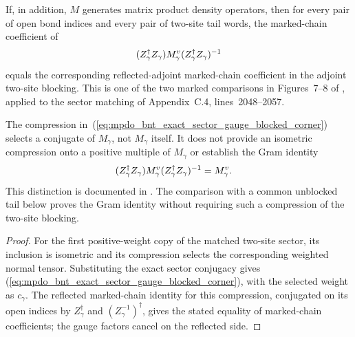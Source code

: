 \begin{lemma}
\begin{center}
\begin{tenkz}[rows={wire}, cols=3, west=open, east=open]
        \end{tenkz}
    \end{center}
    If, in addition, $M$ generates matrix product density operators, then for
    every pair of open bond indices and every pair of two-site tail words, the
    marked-chain coefficient of
    \begin{align}
        (Z_\gamma^\dagger Z_\gamma)M_\gamma^v
        (Z_\gamma^\dagger Z_\gamma)^{-1}
        \notag
    \end{align}
    equals the corresponding reflected-adjoint marked-chain coefficient in
    the adjoint two-site blocking. This is one of the two marked comparisons
    in Figures~7--8 of
    \cite[Proposition~4.13, lines~1909--1919]{Cirac2016MPDO_arXiv}, applied
    to the sector matching of Appendix~C.4, lines~2048--2057.

    The compression in~(\ref{eq:mpdo_bnt_exact_sector_gauge_blocked_corner})
    selects a conjugate of $M_\gamma$, not $M_\gamma$ itself. It does not
    provide an isometric compression onto a positive multiple of $M_\gamma$
    or establish the Gram identity
    \begin{align}
        (Z_\gamma^\dagger Z_\gamma)M_\gamma^v
        (Z_\gamma^\dagger Z_\gamma)^{-1}
         & =M_\gamma^v.
        \notag
    \end{align}
    This distinction is documented in
    \cite{gap:cpsv16_two_site_sector_unitary_gauge_gap}.
    The comparison with a common unblocked tail below proves the Gram
    identity without requiring such a compression of the two-site blocking.
\end{lemma}

\begin{proof}\leanok
    For the first positive-weight copy of the matched two-site sector,
    its inclusion is isometric and its compression selects the
    corresponding weighted normal tensor. Substituting the exact sector
    conjugacy gives
    (\ref{eq:mpdo_bnt_exact_sector_gauge_blocked_corner}), with the selected
    weight as $c_\gamma$. The reflected marked-chain identity for this
    compression, conjugated on its open indices by $Z_\gamma^\dagger$ and
    $(Z_\gamma^{-1})^\dagger$, gives the stated equality of marked-chain
    coefficients; the gauge factors cancel on the reflected side.
\end{proof}

